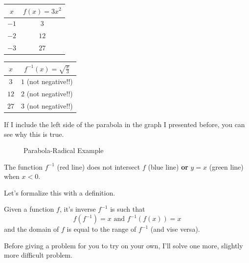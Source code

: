 \begin{center}
    \begin{tabular}{ c | c }
        $x$ & $f(x) = 3x^2$ \\
        \hline
        $-1$ & $3$ \\
        \hline
        $-2$ & $12$ \\
        \hline
        $-3$ & $27$
    \end{tabular}
    \quad
    \begin{tabular}{ c | c }
        $x$ & $f^{-1}(x) = \sqrt{\frac{x}{3}}$ \\
        \hline
        $3$ & $1$ (not negative!!) \\
        \hline
        $12$ & $2$ (not negative!!)\\
        \hline
        $27$ & $3$ (not negative!!)
    \end{tabular}
\end{center}\clearpage
If I include the left side of the parabola in the graph I presented before, you can see why this is true.
\begin{figure}[ht]
    \caption{Parabola-Radical Example}
    \label{fig:Parabola-Radical Example}
    \centering
\end{figure}

The function $f^{-1}$ (red line) does not intersect $f$ (blue line) \textbf{or} $y = x$ (green line) when $x < 0$.

Let's formalize this with a definition.
\begin{definition}
    Given a function $f$, it's inverse $f^{-1}$ is such that
    \[
        f(f^{-1}) = x \text{ and } f^{-1}(f(x)) = x
    \]
    and the domain of $f$ is equal to the range of $f^{-1}$ (and vise versa).
\end{definition}
\clearpage
Before giving a problem for you to try on your own, I'll solve one more, slightly more difficult problem.

